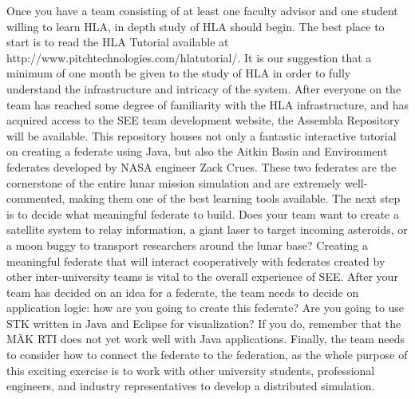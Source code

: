 \documentclass[journal, onecolumn]{IEEEtran}
\begin{document}
Once you have a team consisting of at least one faculty advisor and one student willing to learn HLA, in depth study of HLA should begin.  The best place to start is to read the HLA Tutorial available at http://www.pitchtechnologies.com/hlatutorial/.  It is our suggestion that a minimum of one month be given to the study of HLA in order to fully understand the infrastructure and intricacy of the system.  After everyone on the team has reached some degree of familiarity with the HLA infrastructure, and has acquired access to the SEE team development website, the Assembla Repository will be available.  This repository houses not only a fantastic interactive tutorial on creating a federate using Java, but also the Aitkin Basin and Environment federates developed by NASA engineer Zack Crues.  These two federates are the cornerstone of the entire lunar mission simulation and are extremely well-commented, making them one of the best learning tools available.
The next step is to decide what meaningful federate to build.  Does your team want to create a satellite system to relay information, a giant laser to target incoming asteroids, or a moon buggy to transport researchers around the lunar base?  Creating a meaningful federate that will interact cooperatively with federates created by other inter-university teams is vital to the overall experience of SEE.  After your team has decided on an idea for a federate, the team needs to decide on application logic: how are you going to create this federate?  Are you going to use STK written in Java and Eclipse for visualization?  If you do, remember that the M{\"A}K RTI does not yet work well with Java applications.   Finally, the team needs to consider how to connect the federate to the federation, as the whole purpose of this exciting exercise is to work with other university students, professional engineers, and industry representatives to develop a distributed simulation.






%
%







\end{document}

